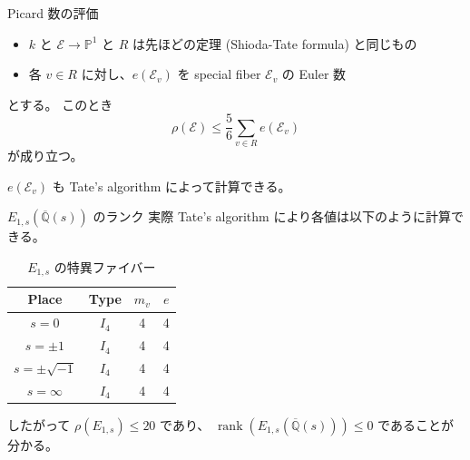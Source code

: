 \documentclass{classes/mybeamer}
\DeclareMathOperator{\rank}{rank}
\begin{document}
\begin{frame}{Picard 数の評価}
    \begin{proposition}
        \begin{itemize}
            \item $k$ と $\mathcal{E} \to \mathbb{P}^1$ と $R$ は先ほどの定理 (Shioda-Tate formula) と同じもの
            \item 各 $v \in R$ に対し、$e(\mathcal{E}_v)$ を special fiber $\mathcal{E}_v$ の Euler 数
        \end{itemize}
        とする。
        このとき
        \begin{equation*}
            \rho(\mathcal{E}) \leq \frac{5}{6} \sum_{v \in R} e(\mathcal{E}_v)
        \end{equation*}
        が成り立つ。
    \end{proposition}
    $e(\mathcal{E}_v)$ も Tate's algorithm によって計算できる。
\end{frame}

\begin{frame}{$E_{1,s}(\overline{\mathbb{Q}}(s))$ のランク}
    実際 Tate's algorithm により各値は以下のように計算できる。
    \begin{table}[htbp]
        \centering
        \caption{$E_{1,s}$ の特異ファイバー}
        \begin{tabular}{|c|c|c|c|}
            \hline
            Place             & Type  & $m_v$ & $e$ \\
            \hline
            $s=0$             & $I_4$ & 4     & 4   \\
            $s=\pm 1$         & $I_4$ & 4     & 4   \\
            $s=\pm \sqrt{-1}$ & $I_4$ & 4     & 4   \\
            $s=\infty$        & $I_4$ & 4     & 4   \\
            \hline
        \end{tabular}
    \end{table}
    したがって $\rho(E_{1,s}) \leq 20$ であり、 $\rank(E_{1,s}(\overline{\mathbb{Q}}(s))) \leq 0$ であることが分かる。
\end{frame}
\end{document}
